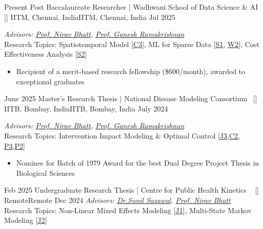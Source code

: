 
\begin{experiences}

\researchexperience
    {Present}   {Post Baccalaureate Researcher | Wadhwani School of Data Science  \& AI{\normalfont  ~ [\href{https://dsai.iitm.ac.in/2024/09/14/wsai-post-baccalaureate-fellowships/}{\small{\websiteSymbol}}]
    }}{IITM, Chennai, India}{IITM, Chennai, India}
    {Jul 2025} {\textit{ Advisors:  \href{https://www.iitmz.ac.in/schools/engineering-and-science/faculty/dr-nirav-bhatt}{Prof. Nirav Bhatt},  \href{https://www.cse.iitb.ac.in/~ganesh/}{Prof. Ganesh Ramakrishnan}}\\
    Research Topics: Spatiotemporal Model [\hyperref[C3]{C3}], ML for Sparse Data [\hyperref[S1]{S1}, \hyperref[W2]{W2}], Cost Effectiveness Analysis [\hyperref[S2]{S2}] 
    \begin{itemize}
        \item Recipient of a merit-based research fellowship (\$600/month), awarded to exceptional graduates

    \end{itemize}
    \vskip 0.1cm
    }
    \emptySeparator
    
\researchexperience
     {June 2025}   {Master's Research Thesis | National Disease Modeling Consortium{\normalfont  ~ [\href{https://www.ndmconsortium.com}{\small{\websiteSymbol}}]
    }}{IITB, Bombay, India}{IITB, Bombay, India}
    {July 2024} {\textit{ Advisors:  \href{https://www.iitmz.ac.in/schools/engineering-and-science/faculty/dr-nirav-bhatt}{Prof. Nirav Bhatt},  \href{https://www.cse.iitb.ac.in/~ganesh/}{Prof. Ganesh Ramakrishnan}}\\
     Research Topics: Intervention Impact Modeling \& Optimal Control [\hyperref[J3]{J3},\hyperref[C2]{C2}, \hyperref[P3P2]{P3,P2}]
     \begin{itemize}
        \item Nominee for Batch of 1979 Award for the best Dual Degree Project Thesis in Biological Sciences

    \end{itemize}
    }


     

  \emptySeparator
 \researchexperience
    {Feb 2025}   {Undergraduate Research Thesis | Centre for Public Health Kinetics {\normalfont  ~ [\href{https://cphealthkinetics.org}{\small{\websiteSymbol}}]
    }}{Remote}{Remote}
    {Dec 2024} {\textit{Advisors: \href{https://publichealth.jhu.edu/faculty/613/sunil-sazawal}{Dr.Sunil Sazawal},  \href{https://www.iitmz.ac.in/schools/engineering-and-science/faculty/dr-nirav-bhatt}{Prof. Nirav Bhatt}}\\
    Research Topics: Non-Linear Mixed Effects Modeling [\hyperref[J1]{J1}], Multi-State Markov Modeling [\hyperref[J2]{J2}]
    }


\end{experiences}
